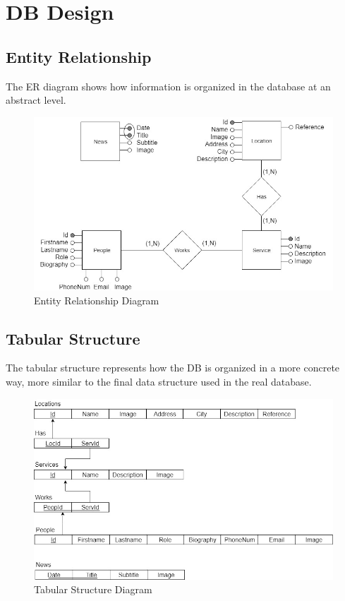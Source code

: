 %
%
\chapter{DB Design}
%
%
\section{Entity Relationship}
\par The ER diagram shows how information is organized in the database at an abstract level.
\begin{figure}[h]
\includegraphics[width=1.2\textwidth, center]{MainMatter/ER.jpg}
\caption{Entity Relationship Diagram}
\label{fig:figure2}
\end{figure}
\newpage
%
\section{Tabular Structure}
\par The tabular structure represents how the DB is organized in a more concrete way, more similar to the final data structure used in the real database. 
\begin{figure}[h]
\includegraphics[width=1.2\textwidth, center]{MainMatter/DB.jpg}
\caption{Tabular Structure Diagram}
\label{fig:figure2}
\end{figure}
%
%
